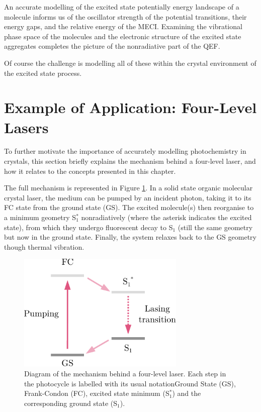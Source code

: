 An accurate modelling of the excited state potentially energy landscape of a molecule informs us of the oscillator strength of the potential transitions, their energy gaps, and the relative energy of the MECI. Examining the vibrational phase space of the molecules and the electronic structure of the excited state aggregates completes the picture of the nonradiative part of the QEF.

Of course the challenge is modelling all of these within the crystal environment of the excited state process.

\section{Example of Application: Four-Level Lasers}

To further motivate the importance of accurately modelling photochemistry in crystals, this section briefly explains the mechanism behind a four-level laser, and how it relates to the concepts presented in this chapter.

The full mechanism is represented in Figure \ref{fig:laser_diag}. In a solid state organic molecular crystal laser, the medium can be pumped by an incident photon, taking it to its FC state from the ground state (GS). The excited molecule(s) then reorganise to a minimum geometry S$_1^*$ nonradiatively (where the asterisk indicates the excited state), from which they undergo fluorescent decay to S$_1$ (still the same geometry but now in the ground state. Finally, the system relaxes back to the GS geometry though thermal vibration.

\begin{figure}
\centering
\includegraphics[width=8cm]{Chapters/4Photochem/laser.pdf}
\caption{Diagram of the mechanism behind a four-level laser. Each step in the photocycle is labelled with its usual notation\textemdash{}Ground State (GS), Frank-Condon (FC), excited state minimum (S$_1^*$) and the corresponding ground state (S$_1$).}
\label{fig:laser_diag}
\end{figure}


